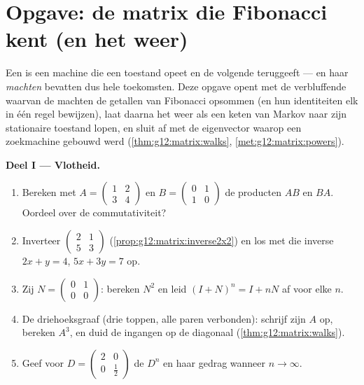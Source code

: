 \section{Opgave: de matrix die Fibonacci kent (en het weer)}

\begin{problem}
\label{pb:g12:matrix:1}
Een  is een machine die een toestand opeet en de volgende teruggeeft ---
en haar \emph{machten} bevatten dus hele toekomsten. Deze opgave opent met de
verbluffende  waarvan de machten de getallen van Fibonacci opsommen (en
hun identiteiten elk in één regel bewijzen), laat daarna het weer als een
keten van Markov naar zijn stationaire toestand lopen, en sluit af met de
eigenvector waarop een zoekmachine gebouwd werd
(\cref{thm:g12:matrix:walks}, \cref{met:g12:matrix:powers}).

\medskip
\noindent\textbf{Deel I --- Vlotheid.}
\begin{enumerate}
  \item Bereken met $A = \begin{pmatrix} 1 & 2\\ 3 & 4\end{pmatrix}$ en
        $B = \begin{pmatrix} 0 & 1\\ 1 & 0\end{pmatrix}$ de producten $AB$ en
        $BA$. Oordeel over de commutativiteit?
  \item Inverteer $\begin{pmatrix} 2 & 1\\ 5 & 3\end{pmatrix}$
        (\cref{prop:g12:matrix:inverse2x2}) en los met die inverse
        $2x + y = 4$, $5x + 3y = 7$ op.
  \item Zij $N = \begin{pmatrix} 0 & 1\\ 0 & 0\end{pmatrix}$: bereken $N^2$ en
        leid $(I + N)^n = I + nN$ af voor elke $n$.
  \item De driehoeksgraaf (drie toppen, alle paren verbonden): schrijf zijn
         $A$ op, bereken $A^3$, en duid de ingangen op de
        diagonaal (\cref{thm:g12:matrix:walks}).
  \item Geef voor $D = \begin{pmatrix} 2 & 0\\ 0 & \frac12 \end{pmatrix}$ de
         $D^n$ en haar gedrag wanneer $n \to \infty$.
\end{enumerate}


\end{problem}
